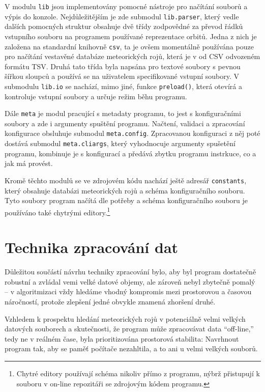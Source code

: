V modulu \texttt{lib} jsou implementovány pomocné nástroje pro načítání souborů a výpis do konzole. Nejdůležitějším je zde submodul \texttt{lib.parser}, který vedle dalších pomocných struktur obsahuje dvě třídy zodpovědné za převod řádků vstupního souboru na programem používané reprezentace orbitů. Jedna z nich je založena na standardní knihovně \texttt{csv}, ta je ovšem momentálně používána pouze pro načítání vestavěné databáze meteorických rojů, která je v od CSV odvozeném formátu TSV. Druhá tato třída byla napsána pro textové soubory s pevnou šířkou sloupců a používá se na uživatelem specifikované vstupní soubory. V submodulu \texttt{lib.io} se nachází, mimo jiné, funkce \texttt{preload()}, která otevírá a kontroluje vstupní soubory a určuje režim běhu programu.

Dále \texttt{meta} je modul pracující s metadaty programu, to jest s konfiguračními soubory a zde i argumenty spuštění programu. Načtení, validaci a zpracování konfigurace obsluhuje submodul \texttt{meta.config}. Zpracovanou konfiguraci z něj poté dostává submodul \texttt{meta.cliargs}, který vyhodnocuje argumenty spušetění programu, kombinuje je s konfigurací a předává zbytku programu instrkuce, co a jak má provést.

\smallskip

Kromě těchto modulů se ve zdrojovém kódu nachází ještě adresář \texttt{constants}, který obsahuje databázi meteorických rojů a schéma konfiguračního souboru. Tyto soubory program načítá dle potřeby a schéma konfiguračního souboru je používáno také chytrými editory.\footnote{Chytré editory používají schéma nikoliv přímo z programu, nýbrž přistupují k souboru v on-line repozitáři se zdrojovým kódem programu.}

\section{Technika zpracování dat}%
Důležitou součástí návrhu techniky zpracování bylo, aby byl program dostatečně robustní a zvládal vemi velké datové objemy, ale zároveň nebyl zbytečně pomalý -- v algoritmizaci vždy hledáme vhodný kompromis mezi prostorovou a časovou náročností, protože zlepšení jedné obvykle znamená zhoršení druhé.

Vzhledem k prospektu hledání meteorických rojů v potenciálně velmi velkých datových souborech a skutečnosti, že program může zpracovávat data "`off-line,"' tedy ne v reálném čase, byla prioritizována prostorová stabilita: Navrhnout program tak, aby se paměť počítače nezahltila, a to ani u velmi velkých souborů.

